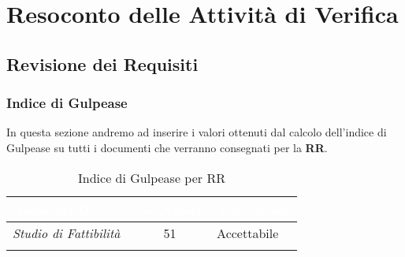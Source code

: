\section{Resoconto delle Attività di Verifica}


\subsection{Revisione dei Requisiti}


\subsubsection{Indice di Gulpease}

In questa sezione andremo ad inserire i valori ottenuti dal calcolo dell'indice di Gulpease su tutti i documenti che verranno consegnati per la \textbf{RR}. 

\begin{longtable}{|C{.40\textwidth}|C{.15\textwidth}|C{.22\textwidth}|}
\hline
{}\textbf{\textcolor{white}{Nome del Documento}} & \textbf{\textcolor{white}{Valore}} & \textbf{\textcolor{white}{Valutazione}} \\
\hline \hline
\endfirsthead
\textit{Studio di Fattibilità} & 51 & Accettabile \\
\hline
\caption{Indice di Gulpease per RR}
\label{indiceGulpeaseRR}
\end{longtable}